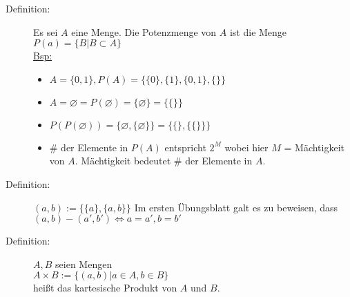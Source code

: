 \begin{description}
\item[Definition:] Es sei $A$ eine Menge. Die Potenzmenge von $A$ ist die Menge $P(a) = \{ B | B \subset A \}$\\
\underline{Bsp:} 
	\begin{itemize}
	\item $A = \{0,1\}, P(A) = \{\{0\},\{1\}, \{0,1\}, \{\} \}$
	\item $A = \varnothing = P(\varnothing) = \{\varnothing\} = \{\{\}\}$
	\item $P(P(\varnothing)) = \{\varnothing,\{\varnothing\}\} = \{\{\},\{\{\}\}\}$
	\item \# der Elemente in $P(A) $ entspricht $2^{M}$ wobei hier $M$ = Mächtigkeit von $A$. Mächtigkeit bedeutet \# der Elemente in $A$.
	\end{itemize} 
\item[Definition:] $(a,b):= \{\{a\},\{a,b\}\}$ Im ersten Übungsblatt galt es zu beweisen, dass\\ $(a,b) - (a',b') \Leftrightarrow a = a', b=b'$
\item[Definition:] $A,B$ seien Mengen\\
$A\times B := \{(a,b)|a\in A, b\in B\}$ \\
heißt das kartesische Produkt von $A$ und $B$.
\end{description}